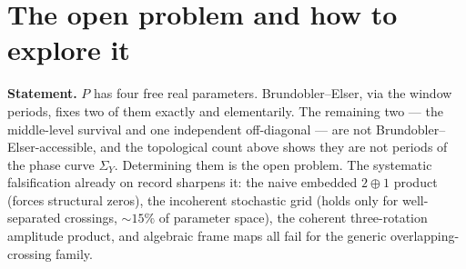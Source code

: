 \documentclass[11pt]{article}
\begin{document}
\section{The open problem and how to explore it}

\textbf{Statement.} $P$ has four free real parameters. Brundobler--Elser, via
the window periods, fixes two of them exactly and elementarily. The remaining
two --- the middle-level survival and one independent off-diagonal --- are not
Brundobler--Elser-accessible, and the topological count above shows they are not
periods of the phase curve $\Sigma_Y$. Determining them is the open problem. The
systematic falsification already on record sharpens it: the naive embedded
$2\oplus1$ product (forces structural zeros), the incoherent stochastic grid
(holds only for well-separated crossings, $\sim15\%$ of parameter space), the
coherent three-rotation amplitude product, and algebraic frame maps all fail for
the generic overlapping-crossing family.
\end{document}
